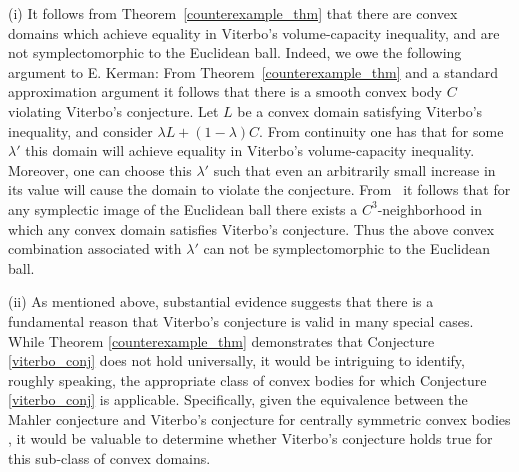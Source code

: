 \documentclass[10pt,a4paper]{article}
\theoremstyle{definition}
\begin{document}


\medskip

(i) It follows from Theorem~\ref{counterexample_thm} that there are convex domains which achieve equality in Viterbo's volume-capacity inequality, and are not symplectomorphic to the Euclidean ball. Indeed, we owe the following argument to E. Kerman: From Theorem~\ref{counterexample_thm}  and a standard approximation argument it follows that there is a smooth convex body $C$ violating Viterbo's conjecture.
Let $L$ be a convex domain  satisfying Viterbo's inequality, and consider $\lambda L + (1 - \lambda)C$. 
From continuity one has that for some $\lambda'$ this domain will achieve equality in Viterbo's volume-capacity inequality. Moreover, one can choose this $\lambda'$
such that even an arbitrarily small increase in its value will cause the domain to violate the conjecture.
From~\cite[Corollary 2]{abbondandoloBenedetti} it follows that for any symplectic image of the Euclidean ball
there exists a $C^3$-neighborhood in which any convex domain satisfies Viterbo’s conjecture. 
Thus the above convex combination associated with $\lambda'$  can not be symplectomorphic to the Euclidean  ball. 


\medskip 




(ii) As mentioned above, substantial evidence suggests that there is a fundamental reason that Viterbo's conjecture is valid in many special cases. While Theorem \ref{counterexample_thm} demonstrates that Conjecture \ref{viterbo_conj} does not hold universally, it would be intriguing to identify, roughly speaking, the appropriate class of convex bodies for which Conjecture \ref{viterbo_conj} is applicable. Specifically, given the equivalence between the Mahler conjecture and Viterbo's conjecture for centrally symmetric convex bodies  \cite{capacity_mahler}, it would be valuable to determine whether Viterbo's conjecture holds true for this sub-class of convex domains. 


\medskip
\end{document}
